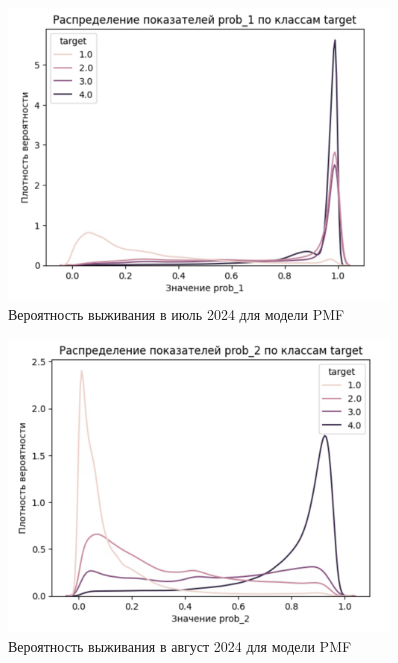 \documentclass[a4paper,14pt,oneside,openany]{memoir}
\begin{document}
\begin{figure}[H]
	\includegraphics[width=0.9\textwidth]{../figures/prob_1_pmf.png}
	\caption{Вероятность выживания в июль 2024 для модели PMF}
\end{figure}

\begin{figure}[H]
	\includegraphics[width=0.9\textwidth]{../figures/prob_2_pmf.png}
	\caption{Вероятность выживания в август 2024 для модели PMF}
\end{figure}
\end{document}
